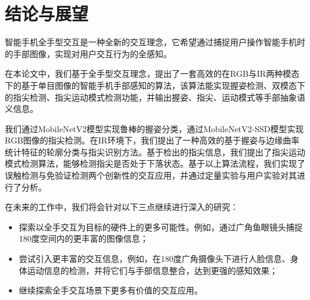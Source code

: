 \chapter{结论与展望}

智能手机全手型交互是一种全新的交互理念，它希望通过捕捉用户操作智能手机时的手部图像，实现对用户交互行为的全感知。

在本论文中，我们基于全手型交互理念，提出了一套高效的在RGB与IR两种模态下的基于单目图像的智能手机手部感知的算法，该算法能实现握姿检测、双模态下的指尖检测、指尖运动模式检测功能，并输出握姿、指尖、运动模式等手部抽象语义信息。

我们通过MobileNetV2模型实现鲁棒的握姿分类，通过MobileNetV2-SSD模型实现RGB图像的指尖检测。在IR环境下，我们提出了一种高效的基于握姿与边缘曲率统计特征的轮廓分类与指尖识别方法。基于检出的指尖信息，我们提出了指尖运动模式检测算法，能够检测指尖是否处于下落状态。基于以上算法流程，我们实现了误触检测与免验证检测两个创新性的交互应用，并通过定量实验与用户实验对其进行了分析。

在未来的工作中，我们将会针对以下三点继续进行深入的研究：

\begin{itemize}
    \item 探索以全手交互为目标的硬件上的更多可能性。例如，通过广角鱼眼镜头捕捉180度空间内的更丰富的图像信息；
    \item 尝试引入更丰富的交互信息，例如，在180度广角摄像头下进行人脸信息、身体运动信息的检测，并将它们与手部信息整合，达到更强的感知效果；
    \item 继续探索全手交互场景下更多有价值的交互应用。
\end{itemize}


